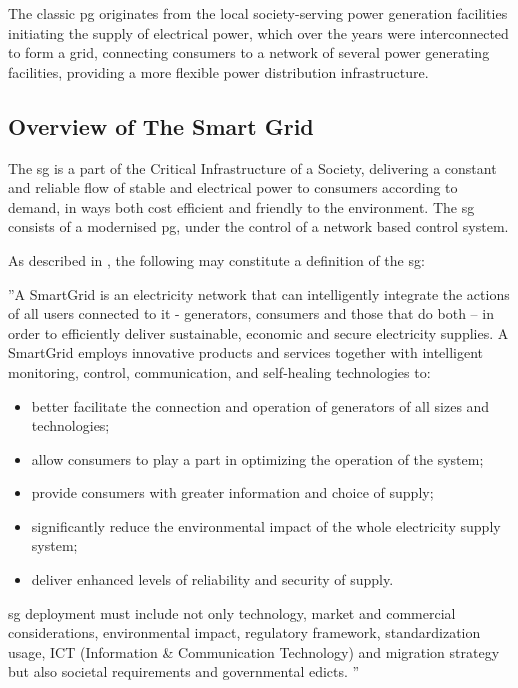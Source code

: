 The classic \acrlong{pg} originates from the local society-serving power generation facilities initiating the supply of electrical power, which over the years were interconnected to form a grid, connecting consumers to a network of several power generating facilities, providing a more flexible power distribution infrastructure. 


\subsection{Overview of The Smart Grid}
The \acrshort{sg} is a part of the Critical Infrastructure of a Society, delivering a constant and reliable flow of stable and electrical power to consumers according to demand, in ways both cost efficient and friendly to the environment. The \acrshort{sg} consists of a modernised \acrshort{pg}, under the control of a network based control system. 



As described in \cite{gopstein2021nist}, the following may constitute a definition of the \acrlong{sg}:

\begin{displayquote}
''A SmartGrid is an electricity network that can intelligently integrate the actions of all
users connected to it - generators, consumers and those that do both – in order to
efficiently deliver sustainable, economic and secure electricity supplies.
A SmartGrid employs innovative products and services together with intelligent monitoring,
control, communication, and self-healing technologies to:
\begin{itemize}
\item better facilitate the connection and operation of generators of all sizes and technologies;
\item allow consumers to play a part in optimizing the operation of the system;
\item provide consumers with greater information and choice of supply;
\item significantly reduce the environmental impact of the whole electricity supply system;
\item deliver enhanced levels of reliability and security of supply.
\end{itemize}
\acrshort{sg} deployment must include not only technology, market and commercial
considerations, environmental impact, regulatory framework, standardization usage, ICT
(Information \& Communication Technology) and migration strategy but also societal
requirements and governmental edicts. 
'' 
\end{displayquote}

